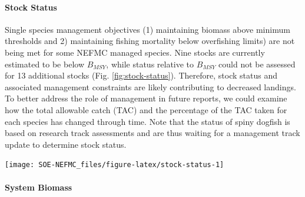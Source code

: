 \documentclass[
  10pt,
]{article}
\let\origfigure\figure
\let\endorigfigure\endfigure
\renewenvironment{figure}[1][2] {
    \expandafter\origfigure\expandafter[H]
} {
    \endorigfigure
}
\begin{document}
\hypertarget{stock-status}{%
\paragraph{Stock Status}\label{stock-status}}

Single species management objectives (1) maintaining biomass above minimum thresholds and 2) maintaining fishing mortality below overfishing limits) are not being met for some NEFMC managed species. Nine stocks are currently estimated to be below \(B_{MSY}\), while status relative to \(B_{MSY}\) could not be assessed for 13 additional stocks (Fig. \ref{fig:stock-status}). Therefore, stock status and associated management constraints are likely contributing to decreased landings. To better address the role of management in future reports, we could examine how the total allowable catch (TAC) and the percentage of the TAC taken for each species has changed through time. Note that the status of spiny dogfish is based on research track assessments and are thus waiting for a management track update to determine stock status.

\begin{figure}

{\centering \texttt{[image: SOE-NEFMC\_files/figure-latex/stock-status-1]} 

}

\caption{Summary of single species status for NEFMC and jointly federally managed stocks (goosefish and spiny dogfish).  The dotted vertical line at one is the target biomass reference point of B\textsubscript{MSY}.  The dashed lines are the management thresholds of B\textsubscript{MSY} (vertical) or F\textsubscript{MSY} (horizontal).  Text color denotes which quadrant of the plot the stocks are in with orange text below F\textsubscript{MSY} and B\textsubscript{MSY}, green above F\textsubscript{MSY} and below B\textsubscript{MSY}, and blue above both F\textsubscript{MSY} and B\textsubscript{MSY}.}\label{fig:stock-status}
\end{figure}

\hypertarget{system-biomass}{%
\paragraph{System Biomass}\label{system-biomass}}
\end{document}
